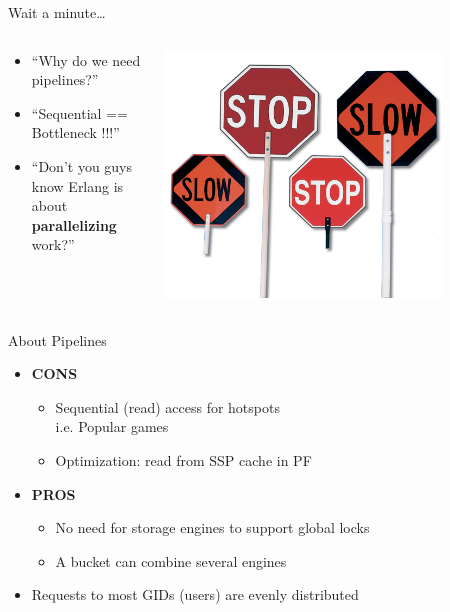 \documentclass[aspectratio=169]{beamer}
\begin{document}
\begin{frame}{Wait a minute\dots}
    \begin{columns}
        \begin{column}[c]{0.5\textwidth}
            \begin{itemize}
                \item ``Why do we need pipelines?''
                \item ``Sequential == Bottleneck !!!''
                \item ``Don't you guys know Erlang is about \textbf{parallelizing} work?''
            \end{itemize}
        \end{column}
        \begin{column}[c]{0.5\textwidth}
            \includegraphics[width=0.8\textwidth]{images/slow.png}
        \end{column}
    \end{columns}
\end{frame}

\begin{frame}{About Pipelines}
    \begin{itemize}
        \item \textbf{CONS}
            \begin{itemize}
                \item Sequential (read) access for hotspots\\
                    i.e. Popular games
                \item Optimization: read from SSP cache in PF
            \end{itemize}
        \pause
        \item \textbf{PROS}
            \begin{itemize}
                \item No need for storage engines to support global locks
                \item A bucket can combine several engines
            \end{itemize}
        \pause
        \item Requests to most GIDs (users) are evenly distributed
    \end{itemize}
\end{frame}
\end{document}

